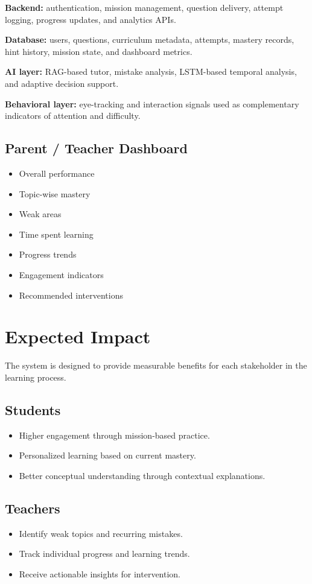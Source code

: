 \documentclass[11pt]{article}
\begin{document}
\textbf{Backend:} authentication, mission management, question delivery, attempt logging, progress updates, and analytics APIs.

\textbf{Database:} users, questions, curriculum metadata, attempts, mastery records, hint history, mission state, and dashboard metrics.

\textbf{AI layer:} RAG-based tutor, mistake analysis, LSTM-based temporal analysis, and adaptive decision support.

\textbf{Behavioral layer:} eye-tracking and interaction signals used as complementary indicators of attention and difficulty.

\subsection{Parent / Teacher Dashboard}
\begin{itemize}
    \item Overall performance
    \item Topic-wise mastery
    \item Weak areas
    \item Time spent learning
    \item Progress trends
    \item Engagement indicators
    \item Recommended interventions
\end{itemize}

\section{Expected Impact}
The system is designed to provide measurable benefits for each stakeholder in the learning process.

\subsection*{Students}
\begin{itemize}
    \item Higher engagement through mission-based practice.
    \item Personalized learning based on current mastery.
    \item Better conceptual understanding through contextual explanations.
\end{itemize}

\subsection*{Teachers}
\begin{itemize}
    \item Identify weak topics and recurring mistakes.
    \item Track individual progress and learning trends.
    \item Receive actionable insights for intervention.
\end{itemize}
\end{document}
